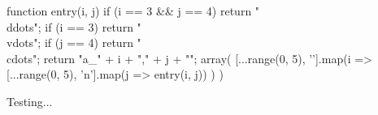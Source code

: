 \documentclass{article}
\begin{document}
\begin{TeXjs}
function entry(i, j) {
  if (i == 3 && j == 4) return "\\ddots";
  if (i == 3) return "\\vdots";
  if (j == 4) return "\\cdots";
  return "a_{" + i + "," + j + "}";
}
array(
  [...range(0, 5), '\ell'].map(i =>
    [...range(0, 5), 'n'].map(j => entry(i, j))
  )
)
\end{TeXjs}

Testing...
\end{document}
